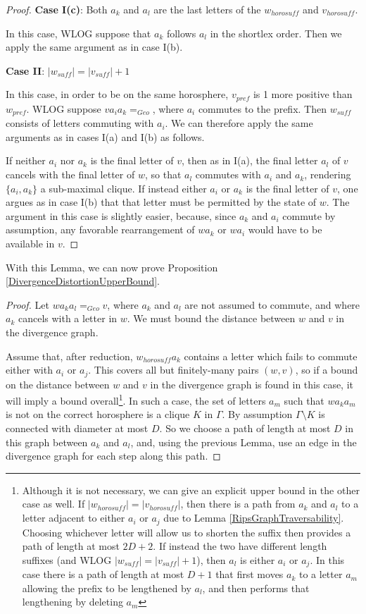 \documentclass{amsart}
\theoremstyle{definition}
\theoremstyle{remark}
\begin{document}
\begin{proof}
		\textbf{Case I(c)}: Both $a_k$ and $a_l$ are the last letters of the $w_{horosuff}$ and $v_{horosuff}$. 
		
		In this case, WLOG suppose that $a_k$ follows $a_l$ in the shortlex order. Then we apply the same argument as in case I(b).		
		
		\textbf{Case II}: $|w_{suff}|=|v_{suff}|+1$
		
		In this case, in order to be on the same horosphere, $v_{pref}$ is 1 more positive than $w_{pref}$. WLOG suppose $va_ia_k=_{Geo}$, where $a_i$ commutes to the prefix. Then $w_{suff}$ consists of letters commuting with $a_i$. We can therefore apply the same arguments as in cases I(a) and I(b) as follows.
		
		If neither $a_i$ nor $a_k$ is the final letter of $v$, then as in I(a), the final letter $a_l$ of $v$ cancels with the final letter of $w$, so that $a_l$ commutes with $a_i$ and $a_k$, rendering $\{a_i, a_k\}$ a sub-maximal clique. If instead either $a_i$ or $a_k$ is the final letter of $v$, one argues as in case I(b) that that letter must be permitted by the state of $w$. The argument in this case is slightly easier, because, since $a_k$ and $a_i$ commute by assumption, any favorable rearrangement of $wa_k$ or $wa_i$ would have to be available in $v$. 
	\end{proof}
	
	With this Lemma, we can now prove Proposition \ref{DivergenceDistortionUpperBound}.
	
	\begin{proof}
		
		Let $wa_ka_l=_{Geo}v$, where $a_k$ and $a_l$ are not assumed to commute, and where $a_k$ cancels with a letter in $w$. We must bound the distance between $w$ and $v$ in the divergence graph.
		
		Assume that, after reduction, $w_{horosuff}a_k$ contains a letter which fails to commute either with $a_i$ or $a_j$. This covers all but finitely-many pairs $(w,v)$, so if a bound on the distance between $w$ and $v$ in the divergence graph is found in this case, it will imply a bound overall\footnote{Although it is not necessary, we can give an explicit upper bound in the other case as well. If $|w_{horosuff}|=|v_{horosuff}|$, then there is a path from $a_k$ and $a_l$ to a letter adjacent to either $a_i$ or $a_j$ due to Lemma \ref{RipsGraphTraversability}. Choosing whichever letter will allow us to shorten the suffix then provides a path of length at most $2D+2$. If instead the two have different length suffixes (and WLOG $|w_{suff}|=|v_{suff}|+1$), then $a_l$ is either $a_i$ or $a_j$. In this case there is a path of length at most $D+1$ that first moves $a_k$ to a letter $a_m$ allowing the prefix to be lengthened by $a_l$, and then performs that lengthening by deleting $a_m$}. In such a case, the set of letters $a_m$ such that $wa_ka_m$ is not on the correct horosphere is a clique $K$ in $\Gamma$. By assumption $\Gamma\setminus K$ is connected with diameter at most $D$. So we choose a path of length at most $D$ in this graph between $a_k$ and $a_l$,  and, using the previous Lemma, use an edge in the divergence graph for each step along this path.		
	\end{proof}
	
\end{document}
